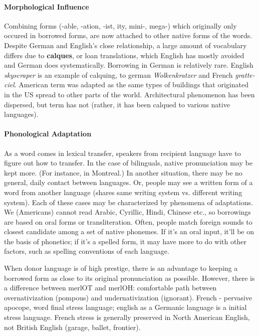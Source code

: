 \documentclass{exam}
\begin{document}
\paragraph{Morphological Influence} Combining forms (-able, -ation, -ist, ity, mini-, mega-) which originally only occured in borrowed forms, are now attached to other native forms of the words. Despite German and English's close relationship, a large amount of vocabulary differs due to \textbf{calques}, or loan translations, which English has mostly avoided and German does systematically. Borrowing in German is relatively rare. English \textit{skyscraper} is an example of calquing, to german \textit{Wolkenkratzer} and French \textit{gratte-ciel}. American term was adapted as the same types of buildings that originated in the US spread to other parts of the world. Architectural phenomenon has been dispersed, but term has not (rather, it has been calqued to various native languages). 

\paragraph{Phonological Adaptation} As a word comes in lexical transfer, speakers from recipient language have to figure out how to transfer. In the case of bilinguals, native pronunciation may be kept more. (For instance, in Montreal.) In another situation, there may be no general, daily contact between languages. Or, people may see a written form of a word from another language (shares same writing system vs. different writing system). Each of these cases may be characterized by phenomena of adaptations. We (Americans) cannot read Arabic, Cyrillic, Hindi, Chinese etc., so borrowings are based on oral forms or transliteration. Often, people match foreign sounds to closest candidate among a set of native phonemes. If it's an oral input, it'll be on the basis of phonetics; if it's a spelled form, it may have more to do with other factors, such as spelling conventions of each language. 

When donor language is of high prestige, there is an advantage to keeping a borrowed form as close to its original pronunciation as possible. However, there is a difference between merlOT and merlOH: comfortable path between overnativization (pompous) and undernativization (ignorant). 
French - pervasive apocope, word final stress language; english as a Germanic language is a initial stress language. French stress is generally preserved in North American English, not British English (garage, ballet, frontier). 
\end{document}
